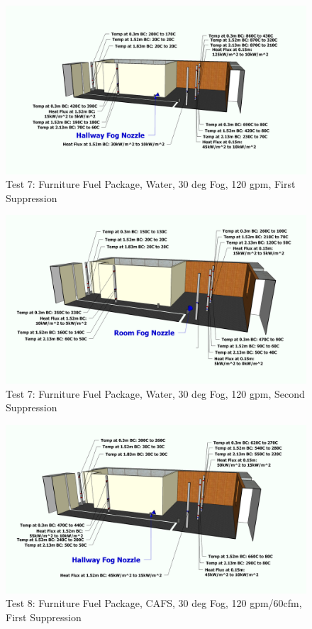 \documentclass[12pt,oneside]{book}
\begin{document}
\begin{figure}[!ht]
	\includegraphics[width=6in]{../Figures/Pictures/Metric/DelCoFogTest7FirstSuppression}
	\caption{Test 7: Furniture Fuel Package, Water, 30 deg Fog, 120 gpm, First Suppression}
	\label{fig:Test_7_First_Suppression}
\end{figure}

\begin{figure}[!ht]
	\includegraphics[width=6in]{../Figures/Pictures/Metric/DelCoFogTest7SecondSuppression}
	\caption{Test 7: Furniture Fuel Package, Water, 30 deg Fog, 120 gpm, Second Suppression}
	\label{fig:Test_7_Second_Suppression}
\end{figure}

\begin{figure}[!ht]
	\includegraphics[width=6in]{../Figures/Pictures/Metric/DelCoFogTest8FirstSuppression}
	\caption{Test 8: Furniture Fuel Package, CAFS, 30 deg Fog, 120 gpm/60cfm, First Suppression}
	\label{fig:Test_8_First_Suppression}
\end{figure}
\end{document}
